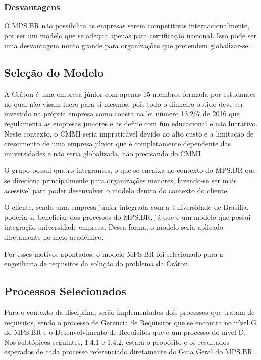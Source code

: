 \subsubsection{Desvantagens}

  O MPS.BR não possibilita as empresas serem competitivas internacionalmente,
  por ser um modelo que se adequa apenas para certificação nacional. Isso pode
  ser uma desvantagem muito grande para organizações que pretendem
  globalizar-se.\cite{francis2012}.

\subsection{Seleção do Modelo}

  A Cráton é uma empresa júnior com apenas 15 membros formada por estudantes no qual
  não visam lucro para si mesmos, pois todo o dinheiro obtido deve ser investido
  na própria empresa como consta na lei número 13.267 de 2016 que regulamenta as empresas
  juniores e as define com fim educacional e não lucrativo. Neste contexto, o CMMI seria
  impraticável devido ao alto custo e a limitação de crescimento de uma empresa júnior que é
  completamente dependente das universidades e não seria globalizada, não precisando do CMMI

  O grupo possui quatro integrantes, o que se encaixa no contexto do MPS.BR que se direciona
  principalmente para organizações menores, fazendo-se ser mais acessível para poder desenvolver
  o modelo dentro do contexto do cliente.

  O cliente, sendo uma empresa júnior integrada com a Universidade de Brasília, poderia se
  beneficiar dos processos do MPS.BR, já que é um modelo que possui integração universidade-empresa.
  Dessa forma, o modelo seria aplicado diretamente no meio acadêmico.

  Por esses motivos apontados, o modelo MPS.BR foi selecionado para a engenharia de requisitos da
  solução do problema da Cráton.

\subsection{Processos Selecionados}

  Para o contexto da disciplina, serão implementados dois processos que tratam de
  requisitos, sendo o processo de Gerência de Requisitos que se encontra no nível
  G do MPS.BR e o Desenvolvimento de Requisitos que é um processo do nível D. Nos
  subtópicos seguintes, 1.4.1 e 1.4.2, estará o propósito e os resultados esperados
  de cada processo referenciado diretamente do Guia Geral do MPS.BR.\cite{softexmps}.

